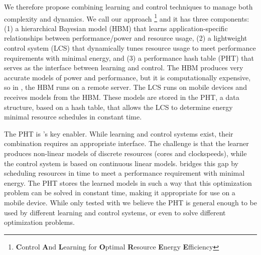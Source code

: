 We therefore propose combining learning and control techniques to
manage both complexity and dynamics.  We call our approach
\SYSTEM{}\footnote{\textbf{C}ontrol \textbf{A}nd \textbf{L}earning for
  \textbf{O}ptimal \textbf{R}esource \textbf{E}nergy
  \textbf{E}fficiency} and it has three components: (1) a hierarchical
Bayesian model (HBM) that learns application-specific relationships
between performance/power and resource usage, (2) a lightweight
control system (LCS) that dynamically tunes resource usage to meet
performance requirements with minimal energy, and (3) a performance
hash table (PHT) that serves as the interface between learning and
control.  The HBM produces very accurate models of power and
performance, but it is computationally expensive, so in \SYSTEM{}, the
HBM runs on a remote server.  The LCS runs on mobile devices and
receives models from the HBM.  These models are stored in the PHT, a
data structure, based on a hash table, that allows the LCS to
determine energy minimal resource schedules in constant time.  

The PHT is \SYSTEM{}'s key enabler.  While learning and control
systems exist, their combination requires an appropriate interface.
The challenge is that the learner produces non-linear models of
discrete resources (\eg cores and clockspeeds), while the control
system is based on continuous linear models.  \SYSTEM{} bridges this
gap by scheduling resources in time to meet a performance requirement
with minimal energy.  The PHT stores the learned models in such a way
that this optimization problem can be solved in constant time, making
it appropriate for use on a mobile device.  While only tested with
\SYSTEM{} we believe the PHT is general enough to be used by different
learning and control systems, or even to solve different optimization
problems.



